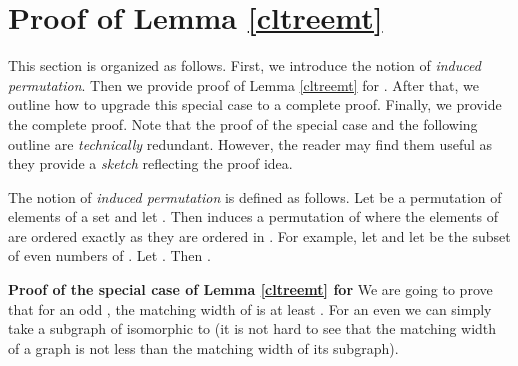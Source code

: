\documentclass{article}
\begin{document}
\begin{comment}
According to Lemma \ref{manyass}, for any permutation of 
 of  we can find a prefix  and a suffix
 so that the assignments to  produce at least 
subfuncto

According to Lemma \ref{cltreemt}, the matching width
of  is at least .
Let  be an {\sc obdd} computing .
Let  be the order of  explored by .
Let  be a prefix of  as specified by Lemma \ref{manyass}
and let  be a set of  assignments to  such that
for any , .

Each assignment  corresponds to a computational path of . 
Due to Proposition \ref{paths}, the final nodes of the computational paths are pairwise distinct. It follows that  has at least  nodes as required. 
\end{comment}



\section{Proof of Lemma \ref{cltreemt}} \label{lbaux2}
This section is organized as follows. First, we introduce the 
notion of \emph{induced permutation}. Then we provide proof
of Lemma \ref{cltreemt} for . After that, we outline how
to upgrade this special case to a complete proof. Finally, we provide
the complete proof. Note that the proof of the special case 
and the following outline are \emph{technically} redundant. 
However, the reader may find them useful as they provide a 
\emph{sketch} reflecting the proof idea. 

The notion of \emph{induced permutation} is defined as follows.
Let  be a permutation of elements of a set 
and let . Then  induces a permutation  of 
where the elements of  are ordered exactly as they are ordered in .
For example, let  and let  be the subset of even numbers
of . Let . Then .

{\bf Proof of the special case of Lemma \ref{cltreemt} for }
We are going to prove that for an odd , the matching width of  is at least
. For an even  we can simply take a subgraph of 
isomorphic to  (it is not hard to see that the matching width of a graph is not 
less than the matching width of its subgraph).
\end{document}
